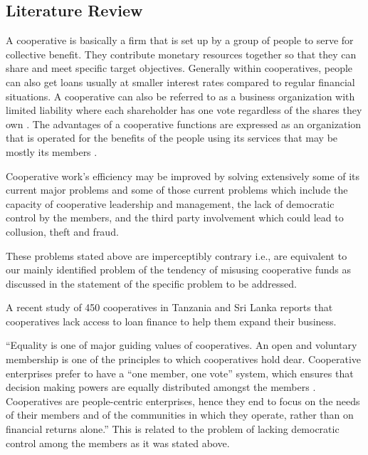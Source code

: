 \documentclass{article}
\begin{document}
\begin{flushleft}
\section{Literature Review}
A cooperative is basically a firm that is set up by a group of people to serve for collective benefit. They contribute monetary resources together so that they can share and meet specific target objectives. Generally within cooperatives, people can also get loans usually at smaller interest rates compared to regular financial situations. A cooperative can also be referred to as a business organization with limited liability where each shareholder has one vote regardless of the shares they own \cite{credo22393191}. The advantages of a cooperative functions are expressed as an organization that is operated for the benefits of the people using its services that may be mostly its members \cite{credo17700186}.

Cooperative work's efficiency may be improved by solving extensively some of its current major problems and some of those current problems which include the capacity of cooperative leadership and management, the lack of democratic control by the members, and the third party involvement which could lead to collusion, theft and fraud. \cite{rca001}


These problems stated above are imperceptibly contrary i.e., are equivalent to our mainly identified problem of the tendency of misusing cooperative funds as discussed in the statement of the specific problem to be addressed. 

A recent study of 450 cooperatives in Tanzania and Sri Lanka reports that cooperatives lack access to loan finance to help them expand their business. 
 
“Equality is one of major guiding values of cooperatives. An open and voluntary membership is one of the principles to which cooperatives hold dear. Cooperative enterprises prefer to have a “one member, one vote” system, which ensures that decision making powers are equally distributed amongst the members . Cooperatives are people-centric enterprises, hence they end to focus on the needs of their members and of the communities in which they operate, rather than on financial returns alone.” \cite{un_issues} This is related to the problem of lacking democratic control among the members as it was stated above.


\end{flushleft}
\end{document}
